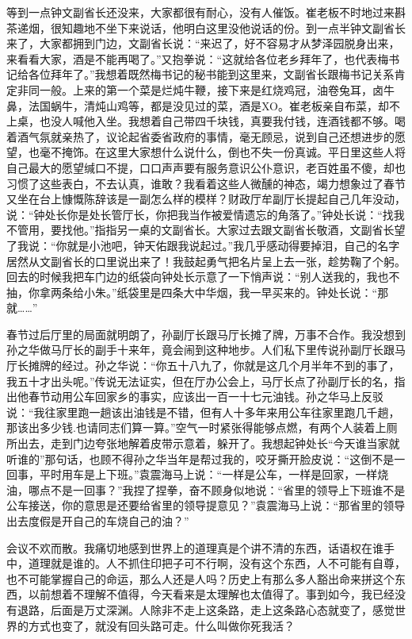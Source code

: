 \documentclass[12pt,oneside]{book}
\begin{document}
等到一点钟文副省长还没来，大家都很有耐心，没有人催饭。崔老板不时地过来斟茶递烟，很知趣地不坐下来说话，他明白这里没他说话的份。到一点半钟文副省长来了，大家都拥到门边，文副省长说：``来迟了，好不容易才从梦泽园脱身出来，来看看大家，酒是不能再喝了。''又抱拳说：``这就给各位老乡拜年了，也代表梅书记给各位拜年了。''我想着既然梅书记的秘书能到这里来，文副省长跟梅书记关系肯定非同一般。上来的第一个菜是烂炖牛鞭，接下来是红烧鸡冠，油卷兔耳，卤牛鼻，法国蜗牛，清炖山鸡等，都是没见过的菜，酒是XO。崔老板亲自布菜，却不上桌，也没人喊他入坐。我想着自己带四千块钱，真要我付钱，连酒钱都不够。喝着酒气氛就亲热了，议论起省委省政府的事情，毫无顾忌，说到自己还想进步的愿望，也毫不掩饰。在这里大家想什么说什么，倒也不失一份真诚。平日里这些人将自己最大的愿望缄口不提，口口声声要有服务意识公仆意识，老百姓虽不傻，却也习惯了这些表白，不去认真，谁敢？我看着这些人微醺的神态，竭力想象过了春节又坐在台上慷慨陈辞该是一副怎么样的模样？财政厅牟副厅长提起自己几年没动，说：``钟处长你是处长管厅长，你把我当作被爱情遗忘的角落了。''钟处长说：``找我不管用，要找他。''指指另一桌的文副省长。大家过去跟文副省长敬酒，文副省长望了我说：``你就是小池吧，钟天佑跟我说起过。''我几乎感动得要掉泪，自己的名字居然从文副省长的口里说出来了！我鼓起勇气把名片呈上去一张，趁势鞠了个躬。回去的时候我把车门边的纸袋向钟处长示意了一下悄声说：``别人送我的，我也不抽，你拿两条给小朱。''纸袋里是四条大中华烟，我一早买来的。钟处长说：``那就\ldots\ldots{}''

春节过后厅里的局面就明朗了，孙副厅长跟马厅长摊了牌，万事不合作。我没想到孙之华做马厅长的副手十来年，竟会闹到这种地步。人们私下里传说孙副厅长跟马厅长摊牌的经过。孙之华说：``你五十八九了，你就是这几个月半年不到的事了，我五十才出头呢。''传说无法证实，但在厅办公会上，马厅长点了孙副厅长的名，指出他春节动用公车回家乡的事实，应该出一百一十七元油钱。孙之华马上反驳说：``我往家里跑一趟该出油钱是不错，但有人十多年来用公车往家里跑几千趟，那该出多少钱.也请同志们算一算。''空气一时紧张得能够点燃，有两个人装着上厕所出去，走到门边夸张地解着皮带示意着，躲开了。我想起钟处长``今天谁当家就听谁的''那句话，也顾不得孙之华当年是帮过我的，咬牙撕开脸皮说：``这倒不是一回事，平时用车是上下班。''袁震海马上说：``一样是公车，一样是回家，一样烧油，哪点不是一回事？''我捏了捏拳，奋不顾身似地说：``省里的领导上下班谁不是公车接送，你的意思是还要给省里的领导提意见？''袁震海马上说：``那省里的领导出去度假是开自己的车烧自己的油？''

会议不欢而散。我痛切地感到世界上的道理真是个讲不清的东西，话语权在谁手中，道理就是谁的。人不抓住印把子可不行啊，没有这个东西，人不可能有自尊，也不可能掌握自己的命运，那么人还是人吗？历史上有那么多人豁出命来拼这个东西，以前想着不理解不值得，今天看来是太理解也太值得了。事到如今，我已经没有退路，后面是万丈深渊。人除非不走上这条路，走上这条路心态就变了，感觉世界的方式也变了，就没有回头路可走。什么叫做你死我活？
\end{document}
